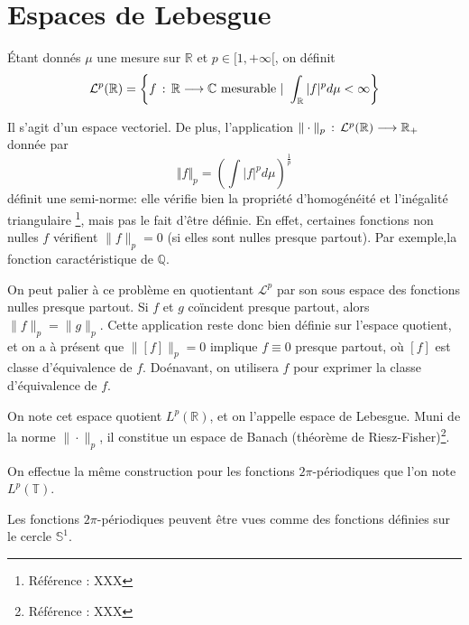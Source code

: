 	\section{Espaces de Lebesgue}
	
		\begin{mydef}
			Étant donnés $\mu$ une mesure sur $\mathbb{R}$ et $p \in [1, +\infty[$, on définit
				$$ \mathcal{L}^{p} (\mathbb{R}) = \left \{ f \, : \, \mathbb{R} \longrightarrow \mathbb{C} \text{ mesurable} ~|~ \int_{\mathbb{R}}|f|^p d\mu < \infty \right \} $$
		\end{mydef}
	
		Il s'agit d'un espace vectoriel. De plus, l'application $\| \cdot \|_p \, : \, \mathcal{L}^p(\mathbb{R}) \longrightarrow \mathbb{R}_+$ donnée par
		 $$\Vert f \Vert_p = \left( \int|f|^pd\mu \right)^{\frac{1}{p}} $$ 
		 définit une semi-norme: elle vérifie bien la propriété d'homogénéité et l'inégalité triangulaire \footnote{Référence : XXX}, mais pas le fait d'être définie. En effet, certaines fonctions non nulles $f$ vérifient $\|f\|_p = 0$ (si elles sont nulles presque partout). Par exemple,la fonction caractéristique de $\mathbb{Q}$. 
		 
		 On peut palier à ce problème en quotientant $\mathcal{L}^p$ par son sous espace des fonctions nulles presque partout. Si $f$ et $g$ coïncident presque partout, alors
		 $\|f\|_p = \|g\|_p$. Cette application reste donc bien définie sur l'espace quotient, et on a à présent que $ \|[f]\|_p = 0$ implique $f \equiv 0$ presque partout, où $[f]$ est classe d'équivalence de $f$. 
		 Doénavant, on utilisera $f$ pour exprimer la classe d'équivalence de $f$.
		 
		 \begin{mydef} 
		 	On note cet espace quotient $L^p(\mathbb{R})$, et on l'appelle espace de Lebesgue. Muni de la norme $\| \cdot \|_p$, il constitue un espace de Banach (théorème de Riesz-Fisher)\footnote{Référence : XXX}. 
		 \end{mydef}
		 
		On effectue la même construction pour les fonctions $2\pi$-périodiques que l'on note $L^p(\mathbb{T})$.
		
		\begin{myrem}
			Les fonctions $2\pi$-périodiques peuvent être vues comme des fonctions définies sur le cercle $\mathbb{S}^1$.
		\end{myrem}

		
	
